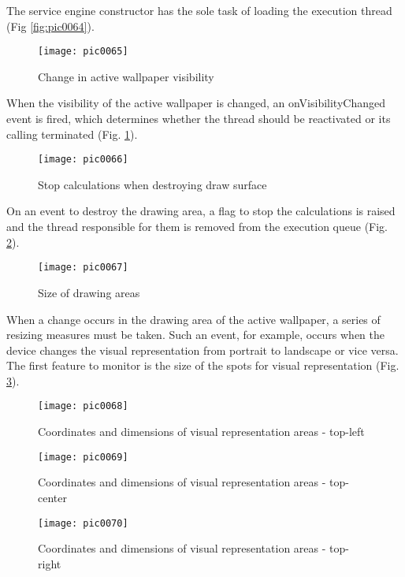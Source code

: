 The service engine constructor has the sole task of loading the execution thread (Fig \ref{fig:pic0064}).

\begin{figure}[h]
\centering
\texttt{[image: pic0065]}
\caption{Change in active wallpaper visibility}
\label{fig:pic0065}
\end{figure}
\FloatBarrier

When the visibility of the active wallpaper is changed, an onVisibilityChanged event is fired, which determines whether the thread should be reactivated or its calling terminated (Fig. \ref{fig:pic0065}).

\begin{figure}[h]
\centering
\texttt{[image: pic0066]}
\caption{Stop calculations when destroying draw surface}
\label{fig:pic0066}
\end{figure}
\FloatBarrier

On an event to destroy the drawing area, a flag to stop the calculations is raised and the thread responsible for them is removed from the execution queue (Fig. \ref{fig:pic0066}).

\begin{figure}[h]
\centering
\texttt{[image: pic0067]}
\caption{Size of drawing areas}
\label{fig:pic0067}
\end{figure}
\FloatBarrier

When a change occurs in the drawing area of the active wallpaper, a series of resizing measures must be taken. Such an event, for example, occurs when the device changes the visual representation from portrait to landscape or vice versa. The first feature to monitor is the size of the spots for visual representation (Fig. \ref{fig:pic0067}).


\begin{figure}[h]
\centering
\texttt{[image: pic0068]}
\caption{Coordinates and dimensions of visual representation areas - top-left}
\label{fig:pic0068}
\end{figure}
\FloatBarrier

\begin{figure}[h]
\centering
\texttt{[image: pic0069]}
\caption{Coordinates and dimensions of visual representation areas - top-center}
\label{fig:pic0069}
\end{figure}
\FloatBarrier

\begin{figure}[h]
\centering
\texttt{[image: pic0070]}
\caption{Coordinates and dimensions of visual representation areas - top-right}
\label{fig:pic0070}
\end{figure}
\FloatBarrier

